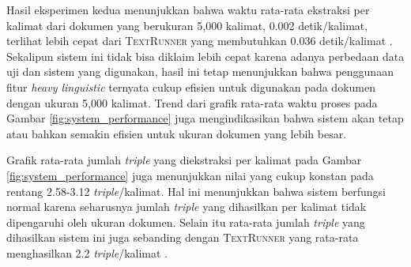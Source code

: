 Hasil eksperimen kedua menunjukkan bahwa waktu rata-rata ekstraksi per kalimat dari dokumen yang berukuran 5,000 kalimat, 0.002 detik/kalimat, terlihat lebih cepat dari \textsc{TextRunner} yang membutuhkan 0.036 detik/kalimat \citep{banko2007open}. Sekalipun sistem ini tidak bisa diklaim lebih cepat karena adanya perbedaan data uji dan sistem yang digunakan, hasil ini tetap menunjukkan bahwa penggunaan fitur \textit{heavy linguistic} ternyata cukup efisien untuk digunakan pada dokumen dengan ukuran 5,000 kalimat. Trend dari grafik rata-rata waktu proses pada Gambar \ref{fig:system_performance} juga mengindikasikan bahwa sistem akan tetap atau bahkan semakin efisien untuk ukuran dokumen yang lebih besar. 

Grafik rata-rata jumlah \textit{triple} yang diekstraksi per kalimat pada Gambar \ref{fig:system_performance} juga menunjukkan nilai yang cukup konstan pada rentang 2.58-3.12 \textit{triple}/kalimat. Hal ini menunjukkan bahwa sistem berfungsi normal karena seharusnya jumlah \textit{triple} yang dihasilkan per kalimat tidak dipengaruhi oleh ukuran dokumen. Selain itu rata-rata jumlah \textit{triple} yang dihasilkan sistem ini juga sebanding dengan \textsc{TextRunner} yang rata-rata menghasilkan 2.2 \textit{triple}/kalimat \citep{banko2007open}.
